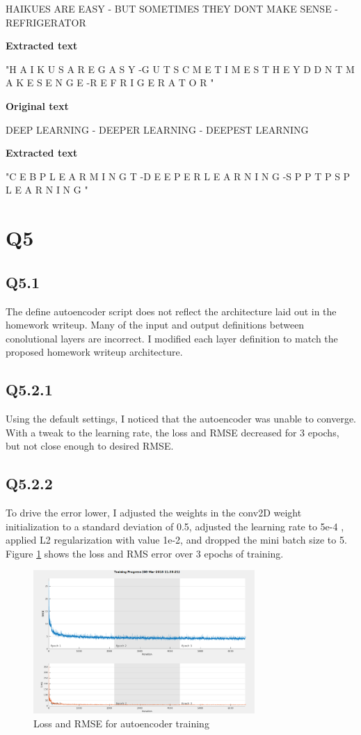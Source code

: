 \documentclass[12pt]{article}
\begin{document}
HAIKUES ARE EASY - BUT SOMETIMES THEY DONT MAKE SENSE - REFRIGERATOR

\bigskip

\textbf { Extracted text }

"H A I K U S A R E G A S Y -G U T S C M E T I M E S T H E Y D D N T M A K E S E N G E -R E F R I G E R A T O R "
 
\bigskip
\textbf { Original text }

DEEP LEARNING  - DEEPER LEARNING - DEEPEST LEARNING

\bigskip

\textbf { Extracted text }

"C E B P L E A R M I N G T -D E E P E R L E A R N I N G -S P P T P S P L E A R N I N G "

\section{Q5}
\subsection{Q5.1}
The define autoencoder script does not reflect the architecture laid out in the homework writeup. Many of the input and output definitions between conolutional layers are incorrect. I modified each layer definition to match the proposed homework writeup architecture.

\subsection{Q5.2.1}
Using the default settings, I noticed that the autoencoder was unable to converge. With a tweak to the learning rate, the loss and RMSE decreased for 3 epochs, but not close enough to desired RMSE. 

\subsection{Q5.2.2}
To drive the error lower, I adjusted the weights in the conv2D weight initialization to a standard deviation of 0.5, adjusted the learning rate to 5e-4 , applied L2 regularization with value 1e-2, and dropped the mini batch size to 5. Figure \ref{fig:nist36confusion} shows the loss and RMS error over 3 epochs of training.

\begin{figure}[H]
\centering
\includegraphics[page=1,width=0.75\textwidth]{q522_mrse4}
\caption{ Loss and RMSE for autoencoder training } 
\label{fig:nist36confusion}
\end{figure}   
\end{document}
